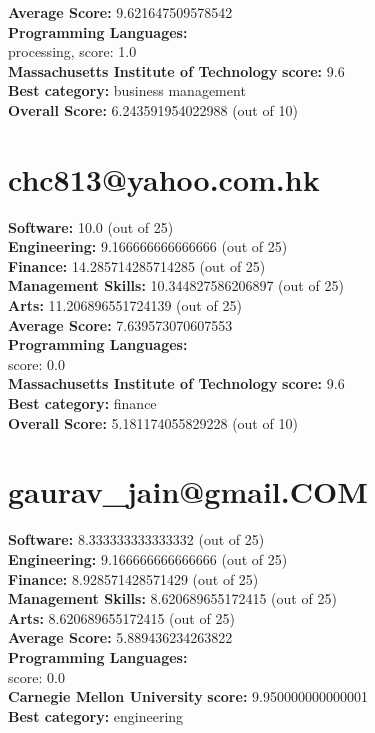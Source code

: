 \documentclass{article}
\begin{document}
\textbf{Average Score: } 9.621647509578542\\
\textbf{Programming Languages:} \\
processing, score: 1.0\\
\textbf{Massachusetts Institute of Technology} \textbf{score:} 9.6\\
\textbf{Best category: } business management\\
\textbf{Overall Score: }6.243591954022988 (out of 10)\section{chc813@yahoo.com.hk}
\textbf{Software:} 10.0 (out of 25)\\
\textbf{Engineering: } 9.166666666666666 (out of 25)\\
\textbf{Finance:} 14.285714285714285 (out of 25)\\
\textbf{Management Skills:} 10.344827586206897 (out of 25)\\
\textbf{Arts:} 11.206896551724139 (out of 25)\\
\textbf{Average Score: } 7.639573070607553\\
\textbf{Programming Languages:} \\
score: 0.0\\
\textbf{Massachusetts Institute of Technology} \textbf{score:} 9.6\\
\textbf{Best category: } finance\\
\textbf{Overall Score: }5.181174055829228 (out of 10)\section{gaurav_jain@gmail.COM}
\textbf{Software:} 8.333333333333332 (out of 25)\\
\textbf{Engineering: } 9.166666666666666 (out of 25)\\
\textbf{Finance:} 8.928571428571429 (out of 25)\\
\textbf{Management Skills:} 8.620689655172415 (out of 25)\\
\textbf{Arts:} 8.620689655172415 (out of 25)\\
\textbf{Average Score: } 5.889436234263822\\
\textbf{Programming Languages:} \\
score: 0.0\\
\textbf{Carnegie Mellon University} \textbf{score:} 9.950000000000001\\
\textbf{Best category: } engineering\\
\end{document}
